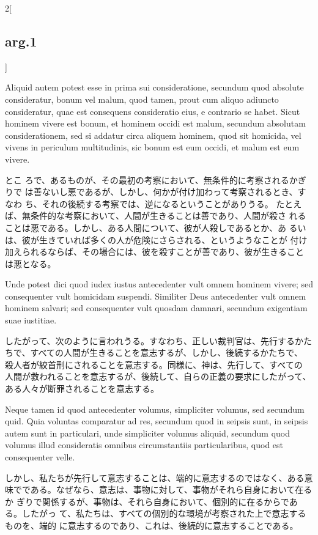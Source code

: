 \documentclass[paper=a4paper,fontsize=10pt,jafontsize=9pt,titlepage]{jlreq}
\begin{document}
\begin{paracol}{2}[\subsection{arg.1}]
\switchcolumn*


Aliquid autem potest
esse in prima sui consideratione, secundum quod absolute consideratur,
bonum vel malum, quod tamen, prout cum aliquo adiuncto consideratur,
quae est consequens consideratio eius, e contrario se habet. Sicut
hominem vivere est bonum, et hominem occidi est malum, secundum
absolutam considerationem, sed si addatur circa aliquem hominem, quod
sit homicida, vel vivens in periculum multitudinis, sic bonum est eum
occidi, et malum est eum vivere.

\switchcolumn

とこ
 ろで、あるものが、その最初の考察において、無条件的に考察されるかぎりで
 は善ないし悪であるが、しかし、何かが付け加わって考察されるとき、すなわ
 ち、それの後続する考察では、逆になるということがありうる。
たとえば、無条件的な考察において、人間が生きることは善であり、人間が殺さ
 れることは悪である。しかし、ある人間について、彼が人殺しであるとか、あ
 るいは、彼が生きていれば多くの人が危険にさらされる、というようなことが
 付け加えられるならば、その場合には、彼を殺すことが善であり、彼が生きること
 は悪となる。

\switchcolumn*


Unde potest dici quod iudex iustus
antecedenter vult omnem hominem vivere; sed consequenter vult homicidam
suspendi. Similiter Deus antecedenter vult omnem hominem salvari; sed
consequenter vult quosdam damnari, secundum exigentiam suae
iustitiae.

\switchcolumn

したがって、次のように言われうる。すなわち、正しい裁判官は、先行するかた
 ちで、すべての人間が生きることを意志するが、しかし、後続するかたちで、
 殺人者が絞首刑にされることを意志する。同様に、神は、先行して、すべての
 人間が救われることを意志するが、後続して、自らの正義の要求にしたがって、
 ある人々が断罪されることを意志する。

\switchcolumn*


Neque tamen id quod antecedenter volumus, simpliciter
volumus, sed secundum quid. 
Quia voluntas comparatur ad res, secundum
quod in seipsis sunt, in seipsis autem sunt in particulari, unde
simpliciter volumus aliquid, secundum quod volumus illud consideratis
omnibus circumstantiis particularibus, quod est consequenter velle.

\switchcolumn

しかし、私たちが先行して意志することは、端的に意志するのではなく、ある意
 味でである。なぜなら、意志は、事物に対して、事物がそれら自身において在るか
 ぎりで関係するが、事物は、それら自身において、個別的に在るからである。したがっ
 て、私たちは、すべての個別的な環境が考察された上で意志するものを、端的
 に意志するのであり、これは、後続的に意志することである。


\end{paracol}
\end{document}
